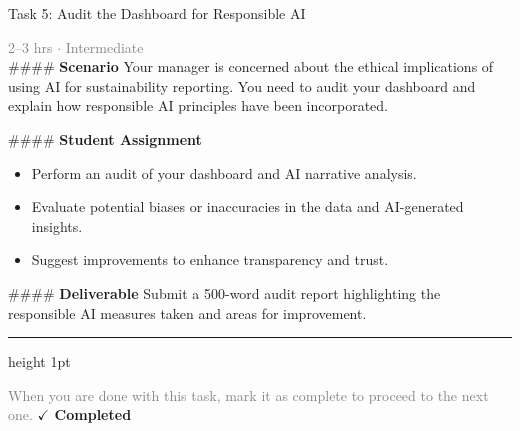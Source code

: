 \documentclass[10pt,a4paper]{article}
\begin{document}
\begin{taskbox}{Task 5: Audit the Dashboard for Responsible AI}

    {\small \textcolor{gray}{2--3 hrs $\cdot$ Intermediate}}\\[12pt]

    \#\#\#\# \textbf{Scenario}  
Your manager is concerned about the ethical implications of using AI for sustainability reporting. You need to audit your dashboard and explain how responsible AI principles have been incorporated.

\#\#\#\# \textbf{Student Assignment}
\begin{itemize}
    \item Perform an audit of your dashboard and AI narrative analysis.  
    \item Evaluate potential biases or inaccuracies in the data and AI-generated insights.  
    \item Suggest improvements to enhance transparency and trust.
\end{itemize}

\#\#\#\# \textbf{Deliverable}  
Submit a 500-word audit report highlighting the responsible AI measures taken and areas for improvement.\par

    \vspace{16pt}

    \textcolor{cardBorder}{\hrule height 1pt}\vspace{8pt}

    \small \textcolor{gray}{When you are done with this task, mark it as complete to proceed to the next one.} \hfill \textbf{\textcolor{brandDark}{$\checkmark$ Completed}}

\end{taskbox}
\end{document}
